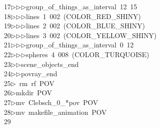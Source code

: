 \begin{tabbing}
17\>$\triangleright$\>$\triangleright$\>$\triangleright$\>group\_of\_things\_as\_interval\ 12\ 15\ \\[0pt]
18\>$\triangleright$\>$\triangleright$\>$\triangleright$\>lines\ 1\ 002\ (COLOR\_RED\_SHINY)\ \\[0pt]
19\>$\triangleright$\>$\triangleright$\>$\triangleright$\>lines\ 2\ 002\ (COLOR\_BLUE\_SHINY)\ \\[0pt]
20\>$\triangleright$\>$\triangleright$\>$\triangleright$\>lines\ 3\ 002\ (COLOR\_YELLOW\_SHINY)\ \\[0pt]
21\>$\triangleright$\>$\triangleright$\>$\triangleright$\>group\_of\_things\_as\_interval\ 0\ 12\ \\[0pt]
22\>$\triangleright$\>$\triangleright$\>$\triangleright$\>spheres\ 4\ 008\ (COLOR\_TURQUOISE)\ \\[0pt]
23\>$\triangleright$\>$\triangleright$\>scene\_objects\_end\ \\[0pt]
24\>$\triangleright$\>$\triangleright$\>povray\_end\\[0pt]
25\>$\triangleright$\>\ rm\ rf\ POV\\[0pt]
26\>$\triangleright$\>mkdir\ POV\\[0pt]
27\>$\triangleright$\>mv\ Clebsch\_0\_*pov\ POV\\[0pt]
28\>$\triangleright$\>mv\ makefile\_animation\ POV\\[0pt]
29\>\end{tabbing}
